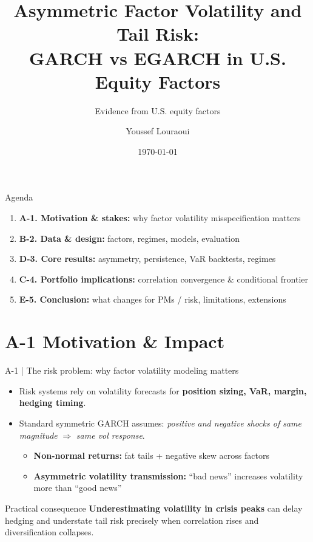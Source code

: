 \documentclass[aspectratio=169,10pt]{beamer}
\title[Asymmetric Factor Volatility]{Asymmetric Factor Volatility and Tail Risk:\\ GARCH vs EGARCH in U.S. Equity Factors}
\subtitle{Evidence from U.S. equity factors}
\author{Youssef Louraoui}
\institute{\quad (youssef.louraoui@essec.edu)}
\date{\today}
\newcommand{\imp}{\textbf{Key implication:} }
\newcommand{\kpi}[1]{\textbf{\color{blue}#1}}
\newcommand{\warn}[1]{\textbf{\color{red}#1}}
\begin{document}
\begin{frame}
  \titlepage
\end{frame}

\begin{frame}{Agenda}
\small
\begin{enumerate}
  \item \kpi{A-1. Motivation \& stakes:} why factor volatility misspecification matters
  \item \kpi{B-2. Data \& design:} factors, regimes, models, evaluation
  \item \kpi{D-3. Core results:} asymmetry, persistence, VaR backtests, regimes
  \item \kpi{C-4. Portfolio implications:} correlation convergence \& conditional frontier
  \item \kpi{E-5. Conclusion:} what changes for PMs / risk, limitations, extensions
\end{enumerate}
\end{frame}

\section{A-1 Motivation \& Impact}

\begin{frame}{A-1 | The risk problem: why factor volatility modeling matters}
\small
\begin{itemize}
  \item Risk systems rely on volatility forecasts for \textbf{position sizing, VaR, margin, hedging timing}.
  \item Standard symmetric GARCH assumes: \emph{positive and negative shocks of same magnitude} $\Rightarrow$ \emph{same vol response}.
  \begin{itemize}
    \item \kpi{Non-normal returns:} fat tails + negative skew across factors
    \item \kpi{Asymmetric volatility transmission:} ``bad news'' increases volatility more than ``good news''
  \end{itemize}
\end{itemize}

\vspace{6pt}
\begin{block}{Practical consequence}
\warn{Underestimating volatility in crisis peaks} can delay hedging and understate tail risk precisely when correlation rises and diversification collapses.
\end{block}
\end{frame}
\end{document}
